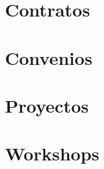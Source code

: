 \documentclass[a4paper]{article}
\begin{document}

%

\renewcommand{\refname}{}

\section*{Contratos}
\label{sec:contratos}
\vspace{-5ex}


\section*{Convenios}
\label{sec:convenios}
\vspace{-5ex}


\section*{Proyectos}
\label{sec:proyectos}
\vspace{-5ex}


\section*{Workshops}
\vspace{-5ex}


\end{document}
